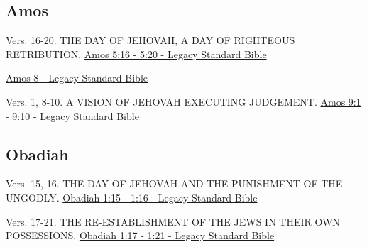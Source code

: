 \documentclass[
  ignorenonframetext,
]{beamer}
\begin{document}
\subsection{Amos}\label{amos}

\begin{frame}{5}
\label{section-122}
\begin{block}{Vers. 16-20. THE DAY OF JEHOVAH, A DAY OF RIGHTEOUS
RETRIBUTION.}
\label{vers.-16-20.-the-day-of-jehovah-a-day-of-righteous-retribution.}
\href{https://read.lsbible.org/?q=am5\%3A16-20}{Amos 5:16 - 5:20 -
Legacy Standard Bible}
\end{block}
\end{frame}

\begin{frame}{8}
\label{section-123}
\href{https://read.lsbible.org/?q=amos8}{Amos 8 - Legacy Standard Bible}
\end{frame}

\begin{frame}{9}
\label{section-124}
\begin{block}{Vers. 1, 8-10. A VISION OF JEHOVAH EXECUTING JUDGEMENT.}
\label{vers.-1-8-10.-a-vision-of-jehovah-executing-judgement.}
\href{https://read.lsbible.org/?q=am9\%3A1-10}{Amos 9:1 - 9:10 - Legacy
Standard Bible}
\end{block}
\end{frame}

\subsection{Obadiah}\label{obadiah}

\begin{frame}{1}
\label{section-125}
\begin{block}{Vers. 15, 16. THE DAY OF JEHOVAH AND THE PUNISHMENT OF THE
UNGODLY.}
\label{vers.-15-16.-the-day-of-jehovah-and-the-punishment-of-the-ungodly.}
\href{https://read.lsbible.org/?q=ob1\%3A15-16}{Obadiah 1:15 - 1:16 -
Legacy Standard Bible}
\end{block}

\begin{block}{Vers. 17-21. THE RE-ESTABLISHMENT OF THE JEWS IN THEIR OWN
POSSESSIONS.}
\label{vers.-17-21.-the-re-establishment-of-the-jews-in-their-own-possessions.}
\href{https://read.lsbible.org/?q=ob1\%3A17-21}{Obadiah 1:17 - 1:21 -
Legacy Standard Bible}
\end{block}
\end{frame}
\end{document}
